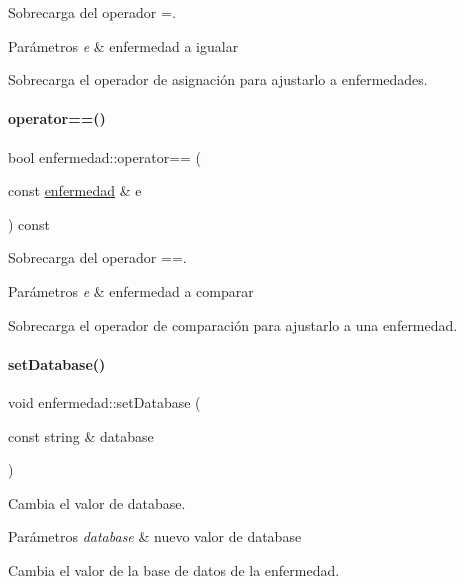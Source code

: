 Sobrecarga del operador =. 


\begin{DoxyParams}{Parámetros}
{\em e} & enfermedad a igualar\\
\hline
\end{DoxyParams}
Sobrecarga el operador de asignación para ajustarlo a enfermedades. \hypertarget{classenfermedad_a8e73dc135566f6ef73c2d66ca4dcf04a}{}\label{classenfermedad_a8e73dc135566f6ef73c2d66ca4dcf04a} 
\paragraph{\texorpdfstring{operator==()}{operator==()}}
{\footnotesize\ttfamily bool enfermedad\+::operator== (\begin{DoxyParamCaption}\item[{const \hyperlink{classenfermedad}{enfermedad} \&}]{e }\end{DoxyParamCaption}) const}



Sobrecarga del operador ==. 


\begin{DoxyParams}{Parámetros}
{\em e} & enfermedad a comparar\\
\hline
\end{DoxyParams}
Sobrecarga el operador de comparación para ajustarlo a una enfermedad. \hypertarget{classenfermedad_ac1f009307d52232420a72264e9c2ce3f}{}\label{classenfermedad_ac1f009307d52232420a72264e9c2ce3f} 
\paragraph{\texorpdfstring{set\+Database()}{setDatabase()}}
{\footnotesize\ttfamily void enfermedad\+::set\+Database (\begin{DoxyParamCaption}\item[{const string \&}]{database }\end{DoxyParamCaption})}



Cambia el valor de database. 


\begin{DoxyParams}{Parámetros}
{\em database} & nuevo valor de database\\
\hline
\end{DoxyParams}
Cambia el valor de la base de datos de la enfermedad. \hypertarget{classenfermedad_a5ad52bdce8de9ac4fe25b460dc699af4}{}\label{classenfermedad_a5ad52bdce8de9ac4fe25b460dc699af4} 

